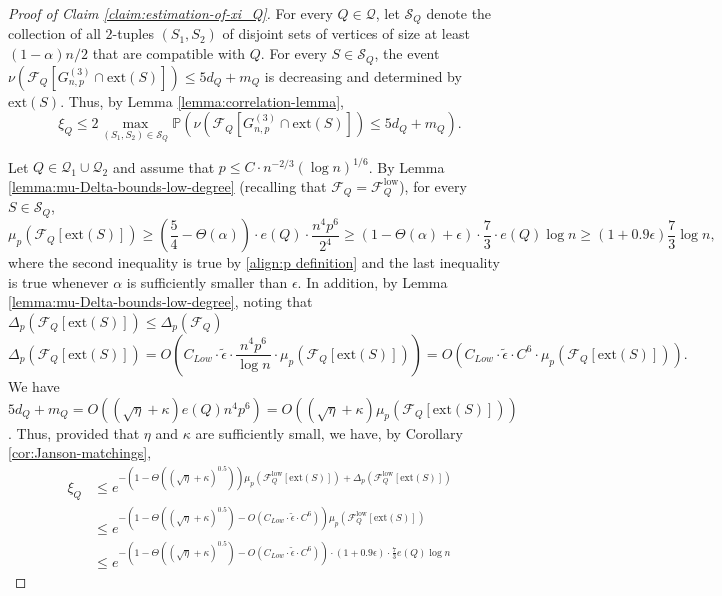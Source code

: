 \documentclass[11pt,a4paper,oneside,reqno]{amsart}
\newcommand{\Gnp}{G_{n, p}^{(3)}}
\newcommand{\cF}{\mathcal{F}}
\newcommand{\cQ}{\mathcal{Q}}
\newcommand{\cS}{\mathcal{S}}
\renewcommand{\Pr}{\mathbb{P}}
\newcommand{\1}{\mathbbm{1}} %
\renewcommand{\le}{\leqslant}
\renewcommand{\ge}{\geqslant}
\newcommand{\cFQL}{\cF_Q^{\mathrm{low}}}
\newcommand{\ext}{\mathrm{ext}}
\begin{document}
\begin{proof}[Proof of Claim \ref{claim:estimation-of-xi_Q}]
    For every $Q \in \cQ$, let $\cS_Q$ denote the collection of all $2$-tuples $(S_1, S_2)$ of disjoint sets of vertices of size at least $(1-\alpha)n/2$ that are compatible with $Q$. For every $S \in \cS_Q$, the event $\nu\left(\cF_Q\left[\Gnp \cap \ext\left(S\right)\right]\right) \le 5d_Q + m_Q$ is decreasing and determined by $\ext(S)$. Thus, by Lemma \ref{lemma:correlation-lemma}, 
    \[
        \xi_Q \le 2\max_{(S_1, S_2) \in \cS_Q} \Pr\left(\nu\left(\cF_Q\left[\Gnp \cap \ext(S)\right]\right) \le 5d_Q + m_Q\right).
    \]

    Let $Q \in \cQ_1 \cup \cQ_2$ and assume that $p \le C \cdot n^{-2/3} \left(\log n\right)^{1/6}$. By Lemma \ref{lemma:mu-Delta-bounds-low-degree} (recalling that $\cF_Q = \cFQL$), for every $S \in \cS_Q$,
    \[
        \mu_p\left(\cF_Q\left[\ext(S)\right]\right) \ge \left(\frac{5}{4} - \Theta(\alpha)\right) \cdot e(Q) \cdot \frac{n^4 p^6}{2^4} \ge \left(1 - \Theta(\alpha) + \epsilon\right) \cdot \frac{7}{3} \cdot e(Q) \log n \ge (1+0.9\epsilon) \frac{7}{3} \log n,
    \]
    where the second inequality is true by \eqref{align:p definition} and the last inequality is true whenever $\alpha$ is sufficiently smaller than $\epsilon$. In addition, by Lemma \ref{lemma:mu-Delta-bounds-low-degree}, noting that $\Delta_p(\cF_Q[\ext(S)]) \le \Delta_p(\cF_Q)$
    \[
        \Delta_p\left(\cF_Q\left[\ext(S)\right]\right) = O\left(C_{Low} \cdot \tilde{\epsilon} \cdot \frac{n^4 p^6}{\log n} \cdot \mu_p\left(\cF_Q\left[\ext(S)\right]\right)\right) = O\left(C_{Low} \cdot \tilde{\epsilon} \cdot C^6 \cdot \mu_p\left(\cF_Q\left[\ext(S)\right]\right)\right).
    \]
    We have $5d_Q + m_Q = O\left((\sqrt{\eta} + \kappa) e(Q) n^4 p^6\right) = O\left((\sqrt{\eta} + \kappa) \mu_p\left(\cF_Q\left[\ext(S)\right]\right)\right)$. Thus, provided that $\eta$ and $\kappa$ are sufficiently small, we have, by Corollary \ref{cor:Janson-matchings},
    \begin{align*}
        \xi_Q &\le e^{-\left(1-\Theta\left(\left(\sqrt{\eta}+\kappa\right)^{0.5}\right)\right)\mu_p\left(\cFQL\left[\ext(S)\right]\right) + \Delta_p\left(\cFQL\left[\ext(S)\right]\right)} \\
        &\le e^{-\left(1-\Theta\left(\left(\sqrt{\eta}+\kappa\right)^{0.5}\right) - O\left(C_{Low} \cdot \tilde{\epsilon} \cdot C^6\right)\right)\mu_p\left(\cFQL\left[\ext(S)\right]\right)} \\
        &\le e^{-\left(1-\Theta\left(\left(\sqrt{\eta}+\kappa\right)^{0.5}\right) - O\left(C_{Low} \cdot \tilde{\epsilon} \cdot C^6\right)\right) \cdot \left(1 + 0.9\epsilon\right) \cdot \frac{7}{3} e(Q) \log n}

\end{align*}
\end{proof}
\end{document}
